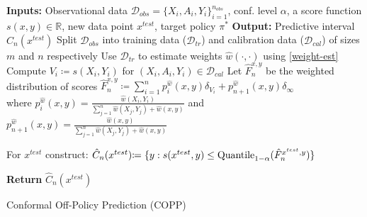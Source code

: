 \begin{algorithm}[!htp]
\SetAlgoLined
\textbf{Inputs:} Observational data $\mathcal{D}_{obs}=\{X_i, A_i, Y_i\}_{i=1}^{n_{obs}}$, conf. level $\alpha$, a score function $s(x,y)\in\mathbb{R}$, new data point $x^{test}$, target policy $\pi^*$ \;
\textbf{Output:} Predictive interval $\hat{C}_n(x^{test})$\;
Split $\mathcal{D}_{obs}$ into training data ($\mathcal{D}_{tr}$) and calibration data ($\mathcal{D}_{cal}$) of sizes $m$ and $n$ respectively\;
Use $\mathcal{D}_{tr}$ to estimate weights $\hat{w}(\cdot, \cdot)$ using \eqref{weight-est}\;
Compute $V_i \coloneqq s(X_i, Y_i)$ for $(X_i, A_i, Y_i) \in \mathcal{D}_{cal}$\;
Let $\hat{F}_{n}^{x, y}$ be the weighted distribution of scores 
$\hat{F}_{n}^{x, y} \coloneqq  \sum_{i=1}^n p_i^{\hat{w}}(x, y) \delta_{V_i} + p_{n+1}^{\hat{w}}(x, y)\delta_{\infty}$\\
where $p_i^{\hat{w}}(x, y) = \frac{\hat{w}(X_i, Y_i)}{\sum_{j=1}^n \hat{w}(X_j, Y_j) + \hat{w}(x, y)}$ and $p_{n+1}^{\hat{w}}(x, y) = \frac{\hat{w}(x, y)}{\sum_{j=1}^n \hat{w}(X_j, Y_j) + \hat{w}(x, y)}$\;


For $x^{test}$ construct:
$
    \hat{C}_n(x^{test})\hspace{-0.1cm} \coloneqq \{y: s(x^{test},y) \leq \text{Quantile}_{1-\alpha}(\hat{F}_{n}^{x^{test}, y})\} \nonumber
$

\textbf{Return} $\hat{C}_n(x^{test})$
  \caption{Conformal Off-Policy Prediction (COPP)}
  \label{cp_covariate_shift}
\end{algorithm}

